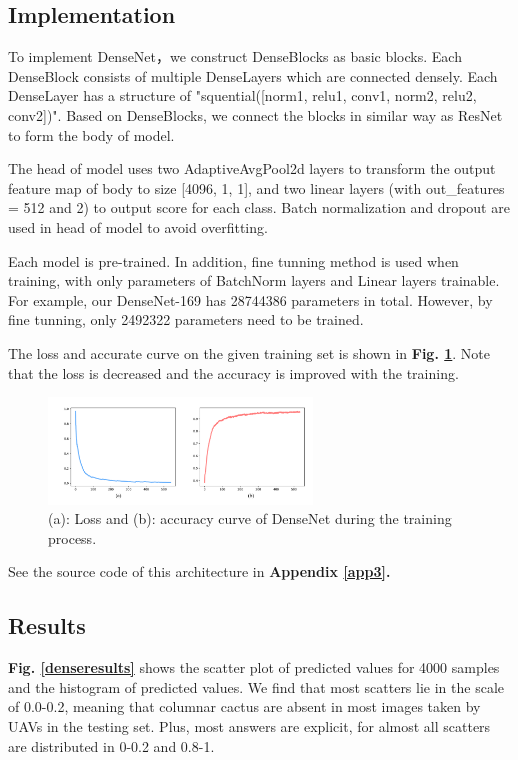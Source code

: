\documentclass[10pt,twocolumn,letterpaper]{article}
\begin{document}
\subsection{Implementation}

To implement \textsf{DenseNet}，we construct DenseBlocks as basic blocks. Each DenseBlock consists of multiple DenseLayers which are connected densely. Each DenseLayer has a structure of "squential([norm1, relu1, conv1, norm2, relu2, conv2])". Based on DenseBlocks, we connect the blocks in similar way as \textsf{ResNet} to form the body of model.

The head of model uses two AdaptiveAvgPool2d layers to transform the output feature map of body to size [4096, 1, 1], and two linear layers (with out\_features = 512 and 2) to output score for each class. Batch normalization and dropout are used in head of model to avoid overfitting.

Each model is pre-trained. In addition, fine tunning method is used when training, with only parameters of BatchNorm layers and Linear layers trainable. For example, our \textsf{DenseNet-169} has 28744386 parameters in total. However, by fine tunning, only 2492322 parameters need to be trained.

The loss and accurate curve on the given training set is shown in \textbf{Fig. \ref{denseacc}}. Note that the loss is decreased and the accuracy is improved with the training.

\begin{figure}[h]
\centering
\includegraphics[width=7cm]{dense_acc.pdf}
\caption{(a): Loss and (b): accuracy curve of \textsf{DenseNet} during the training process.}
\label{denseacc}
\end{figure}

See the source code of this architecture in \textbf{Appendix \ref{app3}.}

\subsection{Results}

\textbf{Fig. \ref{denseresults}} shows the scatter plot of predicted values for 4000 samples and the histogram of predicted values. We find that most scatters lie in the scale of 0.0-0.2, meaning that columnar cactus are absent in most images taken by UAVs in the testing set. Plus, most answers are explicit, for almost all scatters are distributed in 0-0.2 and 0.8-1.
\end{document}
